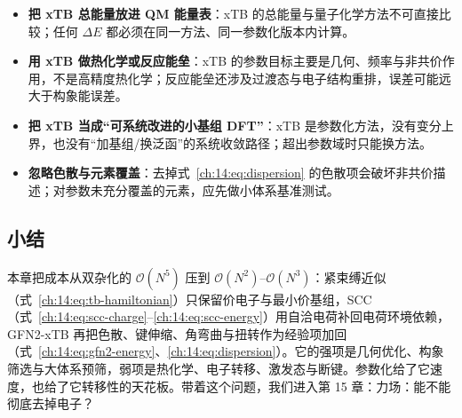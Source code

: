 \begin{pitfall}
\begin{itemize}
  \item \textbf{把 xTB 总能量放进 QM 能量表}：xTB 的总能量与量子化学方法不可直接比较；任何 $\Delta E$ 都必须在同一方法、同一参数化版本内计算。
  \item \textbf{用 xTB 做热化学或反应能垒}：xTB 的参数目标主要是几何、频率与非共价作用，不是高精度热化学；反应能垒还涉及过渡态与电子结构重排，误差可能远大于构象能误差。
  \item \textbf{把 xTB 当成“可系统改进的小基组 DFT”}：xTB 是参数化方法，没有变分上界，也没有“加基组/换泛函”的系统收敛路径；超出参数域时只能换方法。
  \item \textbf{忽略色散与元素覆盖}：去掉式~\eqref{ch:14:eq:dispersion} 的色散项会破坏非共价描述；对参数未充分覆盖的元素，应先做小体系基准测试。
\end{itemize}
\end{pitfall}

\subsection*{小结}
本章把成本从双杂化的 $\mathcal{O}(N^5)$ 压到 $\mathcal{O}(N^2)$–$\mathcal{O}(N^3)$：紧束缚近似（式~\eqref{ch:14:eq:tb-hamiltonian}）只保留价电子与最小价基组，SCC（式~\eqref{ch:14:eq:scc-charge}--\eqref{ch:14:eq:scc-energy}）用自洽电荷补回电荷环境依赖，GFN2-xTB 再把色散、键伸缩、角弯曲与扭转作为经验项加回（式~\eqref{ch:14:eq:gfn2-energy}、\eqref{ch:14:eq:dispersion}）。它的强项是几何优化、构象筛选与大体系预筛，弱项是热化学、电子转移、激发态与断键。参数化给了它速度，也给了它转移性的天花板。带着这个问题，我们进入第 15 章：力场：能不能彻底去掉电子？
